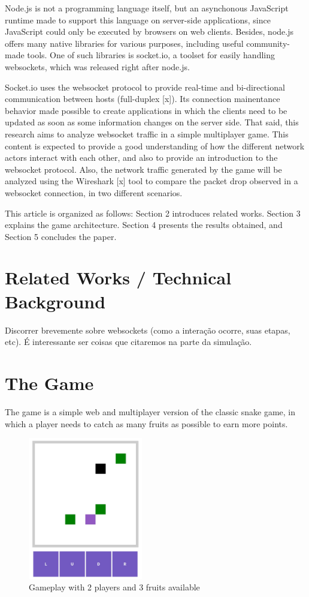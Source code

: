 \documentclass[english]{sbrt}
\begin{document}
Node.js is not a programming language itself, but an asynchonous JavaScript runtime made to support this language on server-side applications, since JavaScript could
only be executed by browsers on web clients. Besides, node.js offers many native libraries for various purposes, including useful community-made tools. One of such libraries is socket.io, a toolset for easily handling websockets, which was released right after node.js.

Socket.io uses the websocket protocol to provide real-time and bi-directional communication between hosts (full-duplex [x]). Its connection mainentance behavior made possible to create applications in which the clients need to be updated as soon as some information changes on the server side. That said, this research aims to analyze websocket traffic in a simple multiplayer game. This content is expected to provide a good understanding of how the different network
actors interact with each other, and also to provide an introduction to the websocket protocol. Also, the network traffic generated by the game will be analyzed
using the Wireshark [x] tool to compare the packet drop observed in a websocket connection, in two different scenarios.

This article is organized as follows: Section 2 introduces related works. Section 3 explains the game architecture. Section 4 presents the results obtained, and Section 5 concludes the paper.

\section{\textbf{Related Works / Technical Background}}

Discorrer brevemente sobre websockets (como a interação ocorre, suas etapas, etc). É interessante ser coisas que citaremos na parte da simulação.

\section{\textbf{The Game}}
The game is a simple web and multiplayer version of the classic snake game, in which a player needs to
catch as many fruits as possible to earn more points.

\begin{figure}[H]
  \centering
  \includegraphics[width=5cm]{game-screen.jpg}
  \caption{Gameplay with 2 players and 3 fruits available}
  \label{game-screen}
\end{figure}
\end{document}
